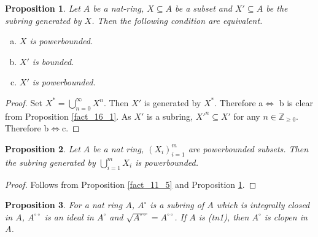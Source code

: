 \documentclass[8pt]{article}
\numberwithin{equation}{section}
\newtheorem{proposition}{Proposition}[subsection]
\newcommand{\Z}[0]{\mathbb{Z}}
\newcommand{\dcirc}[0]{{\circ\circ}}
\begin{document}
\begin{proposition}
    \label{fact_16_2}
    Let $A$ be a nat-ring, $X\subseteq A$ be a subset and $X'\subseteq A$ be the subring generated by $X$. Then the following condition are equivalent.
    \begin{enumerate}[a.]
        \item $X$ is powerbounded.
        \item $X'$ is bounded.
        \item $X'$ is powerbounded.
    \end{enumerate} 
\end{proposition}
\begin{proof}
    Set $X^* = \bigcup_{n=0}^\infty X^n$. Then $X'$ is generated by $X^*$. Therefore a$\Leftrightarrow$ b is clear from Proposition \ref{fact_16_1}. As $X'$ is a subring, $X'^n\subseteq X'$ for any $n\in\Z_{\geq0}$. Therefore b$\Leftrightarrow$c.
\end{proof}
\begin{proposition}
    \label{fact_16_3}
    Let $A$ be a nat ring, $(X_i)_{i=1}^m$ are powerbounded subsets. Then the subring generated by $\bigcup_{i=1}^mX_i$ is powerbounded. %
\end{proposition}
\begin{proof}
    Follows from Proposition \ref{fact_11_5} and Proposition \ref{fact_16_2}.
\end{proof}

\begin{proposition}
    \label{fact_16_5}
    For a nat ring $A$, $A^\circ$ is a subring of $A$ which is integrally closed in $A$, $A^\dcirc$ is an ideal in $A^\circ$ and $\sqrt{A^\dcirc}=A^\dcirc$. If $A$ is (tn1), then $A^\circ$ is clopen in $A$.
\end{proposition}
\end{document}
